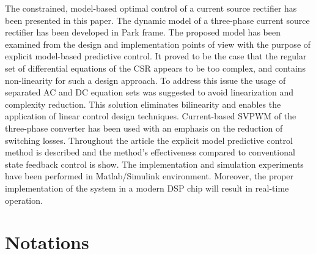     The constrained, model-based optimal control of a current source rectifier has been presented in this paper. The dynamic model of a three-phase current source rectifier has been developed in Park frame. The proposed model has been examined from the design and implementation points of view with the purpose of explicit model-based predictive control. It proved to be the case that the regular set of differential equations of the CSR appears to be too complex, and contains non-linearity for such a design approach. To address this issue the usage of separated AC and DC equation sets was suggested to avoid linearization and complexity reduction. This solution eliminates bilinearity and enables the application of linear control design techniques. Current-based SVPWM of the three-phase converter has been used with an emphasis on the reduction of switching losses. Throughout the article the explicit model predictive control method is described and the method's effectiveness compared to conventional state feedback control is show. The implementation and simulation experiments have been performed in Matlab/Simulink environment. Moreover, the proper implementation of the system in a modern DSP chip will result in real-time operation.
		
		\section{Notations}
		
